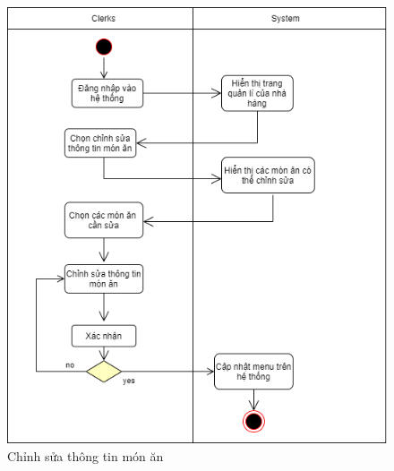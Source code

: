 \begin{figure}[!h]
    \begin{center}
        \includegraphics[scale=0.4]{Images/ActivityDiagram/AD_edit.png}
    \end{center}
    \hspace{0.2cm}
    \caption{Chỉnh sửa thông tin món ăn}
\end{figure}
